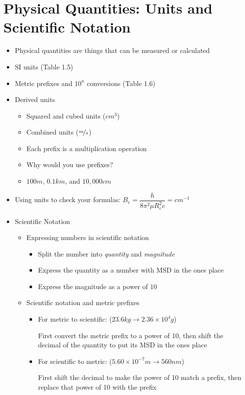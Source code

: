 \documentclass[12pt, openany, letterpaper]{memoir}
\begin{document}
\section{Physical Quantities: Units and Scientific Notation}
\begin{itemize}
	\item Physical quantities are things that can be measured or calculated
	\item SI units (Table 1.5)
	\item Metric prefixes and $10^n$ conversions (Table 1.6)
	\item Derived units
	      \begin{itemize}
		      \item Squared and cubed units ($cm^3$)
		      \item Combined units ($\nicefrac{m}{s}$)
	      \end{itemize}
	      \begin{itemize}
		      \item Each prefix is a multiplication operation
		      \item Why would you use prefixes?
		      \item $100m$, $0.1km$, and $10,000cm$
	      \end{itemize}
	\item Using units to check your formulas: $B_e = \dfrac{h}{8\pi^2\mu R_e^2c}=cm^{-1}$
	\item Scientific Notation
	      \begin{itemize}
		      \item Expressing numbers in scientific notation
		            \begin{itemize}
			            \item Split the number into \emph{quantity} and \emph{magnitude}
			            \item Express the quantity as a number with MSD in the ones place
			            \item Express the magnitude as a power of $10$
		            \end{itemize}
		      \item Scientific notation and metric prefixes
		            \begin{itemize}
			            \item For metric to scientific: ($23.6kg\rightarrow2.36\times10^4g$)

			                  First convert the metric prefix to a power of 10, then shift the decimal of the quantity to put its MSD in the ones place
			            \item For scientific to metric: ($5.60\times10^{-7}m\rightarrow560nm$)

			                  First shift the decimal to make the power of 10 match a prefix, then replace that power of 10 with the prefix
		            \end{itemize}
	      \end{itemize}
\end{itemize}
\end{document}
